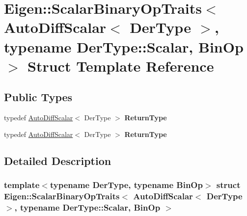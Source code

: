 \hypertarget{struct_eigen_1_1_scalar_binary_op_traits_3_01_auto_diff_scalar_3_01_der_type_01_4_00_01typename_8029eb4becd448e88ba5e4cb75a4dd2b}{}\section{Eigen\+:\+:Scalar\+Binary\+Op\+Traits$<$ Auto\+Diff\+Scalar$<$ Der\+Type $>$, typename Der\+Type\+:\+:Scalar, Bin\+Op $>$ Struct Template Reference}
\label{struct_eigen_1_1_scalar_binary_op_traits_3_01_auto_diff_scalar_3_01_der_type_01_4_00_01typename_8029eb4becd448e88ba5e4cb75a4dd2b}
\subsection*{Public Types}
\begin{DoxyCompactItemize}
\item 
\mbox{\label{struct_eigen_1_1_scalar_binary_op_traits_3_01_auto_diff_scalar_3_01_der_type_01_4_00_01typename_8029eb4becd448e88ba5e4cb75a4dd2b_a5e8f04ebd3db02f2d308cc1690052840}} 
typedef \hyperlink{class_eigen_1_1_auto_diff_scalar}{Auto\+Diff\+Scalar}$<$ Der\+Type $>$ {\bfseries Return\+Type}
\item 
\mbox{\label{struct_eigen_1_1_scalar_binary_op_traits_3_01_auto_diff_scalar_3_01_der_type_01_4_00_01typename_8029eb4becd448e88ba5e4cb75a4dd2b_a5e8f04ebd3db02f2d308cc1690052840}} 
typedef \hyperlink{class_eigen_1_1_auto_diff_scalar}{Auto\+Diff\+Scalar}$<$ Der\+Type $>$ {\bfseries Return\+Type}
\end{DoxyCompactItemize}


\subsection{Detailed Description}
\subsubsection*{template$<$typename Der\+Type, typename Bin\+Op$>$\newline
struct Eigen\+::\+Scalar\+Binary\+Op\+Traits$<$ Auto\+Diff\+Scalar$<$ Der\+Type $>$, typename Der\+Type\+::\+Scalar, Bin\+Op $>$}



